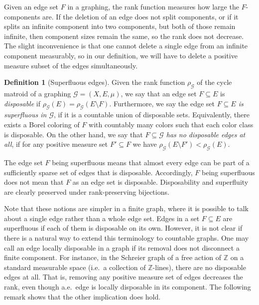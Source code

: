 \documentclass{article}
\theoremstyle{plain}
\theoremstyle{definition}
\newtheorem{defn}[thm]{Definition}
\newcommand{\Z}{\mathbb{Z}}
\newcommand{\cG}{\mathcal{G}}
\begin{document}
Given an edge set $F$ in a graphing, the rank function measures how large the $F$-components are. If the deletion of an edge does not split components, or if it splits an infinite component into two components, but both of those remain infinite, then component sizes remain the same, so the rank does not decrease. The slight inconvenience is that one cannot delete a single edge from an infinite component measurably, so in our definition, we will have to delete a positive measure subset of the edges simultaneously. 

\begin{defn}[Superfluous edges]
    Given the rank function $\rho_{\cG}$ of the cycle matroid of a graphing $\cG=(X,E,\mu)$, we say that an edge set $F\subseteq E$ is \emph{disposable} if $\rho_{\cG}(E)=\rho_{\cG}(E\setminus F)$. 
    Furthermore, we say the edge set \emph{$F \subseteq E$ is superfluous in $\cG$}, if it is a countable union of disposable sets. Equivalently, there exists a Borel coloring of $F$ with countably many colors such that each color class is disposable. On the other hand, we say that \emph{$F \subseteq \cG$ has no disposable edges at all}, if for any positive measure set $F' \subseteq F$ we have $\rho_{\cG}(E\setminus F')<\rho_{\cG}(E)$. 
\end{defn}

The edge set $F$ being superfluous means that almost every edge can be part of a sufficiently sparse set of edges that is disposable. Accordingly, $F$ being superfluous does not mean that $F$ as an edge set is disposable. Disposability and superfluity are clearly preserved under rank-preserving bijections.

Note that these notions are simpler in a finite graph, where it is possible to talk about a single edge rather than a whole edge set. Edges in a set $F\subseteq E$ are superfluous if each of them is disposable on its own. However, it is not clear if there is a natural way to extend this terminology to countable graphs. One may call an edge locally disposable in a graph if its removal does not disconnect a finite component. For instance, in the Schreier graph of a free action of $\Z$ on a standard measurable space (i.e.\ a collection of $\Z$-lines), there are no disposable edges at all. That is, removing any positive measure set of edges decreases the rank, even though a.e.~edge is locally disposable in its component. The following remark shows that the other implication does hold.
\end{document}
